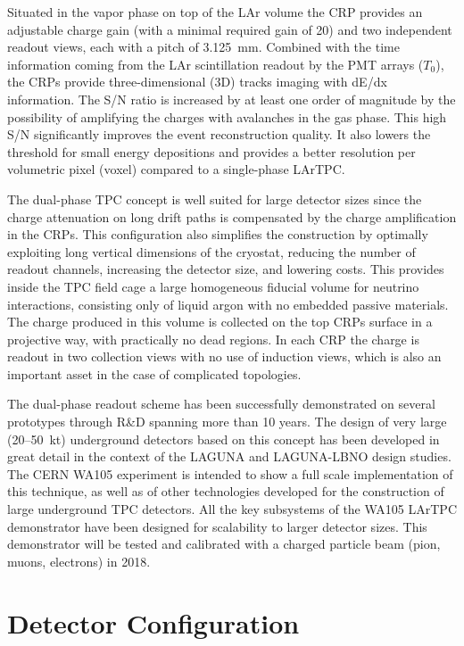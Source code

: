 Situated in the vapor phase on top of the LAr volume the CRP provides
an adjustable charge gain (with a minimal required gain of 20) and two
independent readout views, each with a pitch of 3.125~mm.  Combined
with the time information coming from the LAr scintillation readout by
the PMT arrays ($T_0$), the CRPs provide three-dimensional (3D) tracks
imaging with dE/dx information. The S/N ratio is increased by at least
one order of magnitude by the possibility of amplifying the charges
with avalanches in the gas phase.  This high S/N significantly
improves the event reconstruction quality. It also lowers the
threshold for small energy depositions and provides a better
resolution per volumetric pixel (voxel) compared to a single-phase
LArTPC.

The dual-phase TPC concept is well suited for large detector sizes
since the charge attenuation on long drift paths is compensated by the
charge amplification in the CRPs.  This configuration also simplifies
the construction by optimally exploiting long vertical dimensions of
the cryostat, reducing the number of readout channels, increasing the
detector size, and lowering costs.  This provides inside the TPC field
cage a large homogeneous fiducial volume for neutrino interactions,
consisting only of liquid argon with no embedded passive
materials. The charge produced in this volume is collected on the top
CRPs surface in a projective way, with practically no dead regions. In
each CRP the charge is readout in two collection views with no use of
induction views, which is also an important asset in the case of
complicated topologies.

The dual-phase readout scheme has been successfully demonstrated on
several prototypes through R\&D spanning more than 10 years.  The
design of very large (20--50~kt) underground detectors based on this
concept has been developed in great detail in the context of the
LAGUNA and LAGUNA-LBNO design studies.  The CERN WA105 experiment is
intended to show a full scale implementation of this technique, as
well as of other technologies developed for the construction of large
underground TPC detectors.  All the key subsystems of the WA105 LArTPC
demonstrator have been designed for scalability to larger detector
sizes.  This demonstrator will be tested and calibrated with a charged
particle beam (pion, muons, electrons) in 2018.


\section{Detector Configuration}

